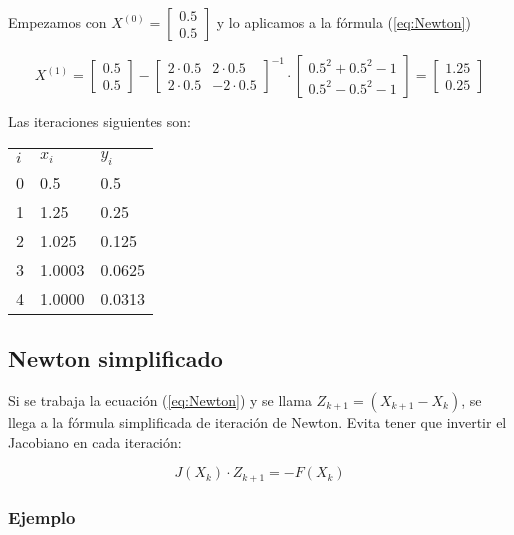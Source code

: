 \documentclass{article}
\begin{document}
Empezamos con $X^{(0)} = \begin{bmatrix}0.5\\0.5\end{bmatrix}$ y lo aplicamos a la fórmula (\ref{eq:Newton})

\begin{equation*}
    X^{(1)} = \begin{bmatrix}0.5\\0.5\end{bmatrix} - \begin{bmatrix}
    2\cdot0.5 & 2\cdot0.5 \\
    2\cdot0.5 & -2\cdot0.5
    \end{bmatrix}^{-1} \cdot \begin{bmatrix}
    0.5^2 + 0.5^2 - 1 \\
    0.5^2 - 0.5^2 - 1
    \end{bmatrix} = \begin{bmatrix}
    1.25 \\ 0.25
    \end{bmatrix}
\end{equation*}

Las iteraciones siguientes son:

\begin{table}[h]
\centering
\begin{tabular}{lll}
$i$ & $x_i$   & $y_i$   \\
0 & 0.5    & 0.5    \\
1 & 1.25   & 0.25   \\
2 & 1.025  & 0.125  \\
3 & 1.0003 & 0.0625 \\
4 & 1.0000 & 0.0313
\end{tabular}
\end{table}

\subsection{Newton simplificado}

Si se trabaja la ecuación (\ref{eq:Newton}) y se llama $Z_{k+1} = \left(X_{k+1} - X_k\right)$, se llega a la fórmula simplificada de iteración de Newton. Evita tener que invertir el Jacobiano en cada iteración:

\begin{equation}\label{eq:Newton-Simp}
    J\left(X_k\right)\cdot Z_{k+1} = -F\left(X_k\right)
\end{equation}

\subsubsection{Ejemplo}
\end{document}
